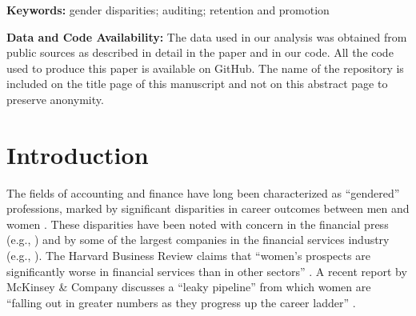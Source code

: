 \documentclass[11pt]{article}
\begin{document}
\vspace{5mm}
\noindent
\textbf{Keywords:} gender disparities; auditing; retention and promotion
    
\vspace{5mm}
\noindent
\textbf{Data and Code Availability:} The data used in our analysis was obtained from public sources as described in detail in the paper and in our code. All the code used to produce this paper is available on GitHub. The name of the repository is included on the title page of this manuscript and not on this abstract page to preserve anonymity.

\newpage
{}
\normalsize
\doublespacing

\section{Introduction} \label{section:Intro}
    The fields of accounting and finance have long been characterized as ``gendered'' professions, marked by significant disparities in career outcomes between men and women \parencite{daltonWomenManagersPartners1997}. These disparities have been noted with concern in the financial press (e.g., \cite{rapoportWomenRarelyRun2018,jaekelWhyWomenArent2016}) and by some of the largest companies in the financial services industry (e.g., \cite{deloitteLeadershipRepresentationGender2022}). The Harvard Business Review claims that ``women's prospects are significantly worse in financial services than in other sectors'' \parencite{jaekelWhyWomenArent2016}. A recent report by McKinsey \& Company discusses a ``leaky pipeline'' from which women are ``falling out in greater numbers as they progress up the career ladder''  \parencite{ellingrudkweilinClosingGenderRace2021}. 
    
\end{document}
